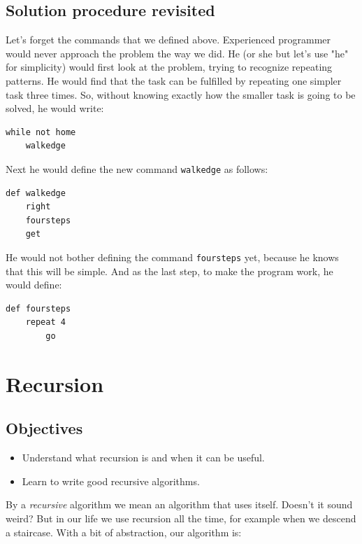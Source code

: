 \subsection{Solution procedure revisited}

Let's forget the commands that we defined above.
Experienced programmer would never approach the problem the way we did.
He (or she but let's use "he" for simplicity) 
would first look at the problem, trying to recognize repeating patterns. 
He would find that the task can be fulfilled by repeating one simpler task 
three times. So, without knowing exactly how the smaller task is going to 
be solved, he would write:

{\small
\begin{verbatim}
while not home
    walkedge
\end{verbatim}
}
\noindent
Next he would define the new command {\tt walkedge} as follows:

{\small
\begin{verbatim}
def walkedge
    right
    foursteps
    get
\end{verbatim}
}
\noindent
He would not bother defining the command 
{\tt foursteps} yet, because he knows that this will be 
simple. And as the last step, to make the program work, he would 
define:

{\small
\begin{verbatim}
def foursteps
    repeat 4
        go
\end{verbatim}
}


\section{Recursion} \label{sec:recursion}

\subsection{Objectives} 
 
\begin{itemize}
\item Understand what recursion is and when it can be useful.
\item Learn to write good recursive algorithms.
\end{itemize}
By a {\em recursive} algorithm we mean an algorithm that uses itself. Doesn't it sound weird?
But in our life we use recursion all the time, for example when we descend a staircase.
With a bit of abstraction, our algorithm is:

